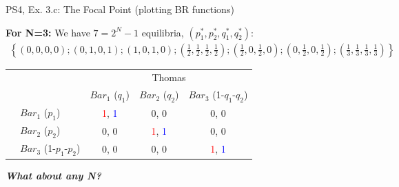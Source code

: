 \begin{frame}{PS4, Ex. 3.c: The Focal Point (plotting BR functions)}
\begin{multicols}{2}
  \vfill\null
  \end{multicols}
    \vspace{-20pt}
    \textbf{For N=3:} We have $7=2^N-1$ equilibria, $(p_1^{*},p_2^{*},q_1^{*},q_2^{*})$:
    \begin{align*}
      \left\{(0,0,0,0);(0,1,0,1);(1,0,1,0)
      ;\left(\frac{1}{2},\frac{1}{2},\frac{1}{2},\frac{1}{2}\right)
      ;\left(\frac{1}{2},0,\frac{1}{2},0\right)
      ;\left(0,\frac{1}{2},0,\frac{1}{2}\right)
      ;\left(\frac{1}{3},\frac{1}{3},\frac{1}{3},\frac{1}{3}\right)
      \right\}
    \end{align*}
    \vspace{-12pt}
    \begin{table}
      \begin{tabular}{cl|c|c|c|}
        & \multicolumn{1}{c}{} & \multicolumn{3}{c}{\color{blue}Thomas}\\
        & \multicolumn{1}{c}{} & \multicolumn{1}{c}{$Bar_1$ ($q_1$)} & \multicolumn{1}{c}{$Bar_2$ ($q_2$)} & \multicolumn{1}{c}{$Bar_3$ (1-$q_1$-$q_2$)} \\\cline{3-5}
        \parbox[t]{1mm}{}
        & $Bar_1$ ($p_1$) & \textcolor{red}{1}, \textcolor{blue}{1} & 0, 0 & 0, 0 \\
        & $Bar_2$ ($p_2$) & 0, 0 & \textcolor{red}{1}, \textcolor{blue}{1} & 0, 0 \\
        & $Bar_3$ (1-$p_1$-$p_2$) & 0, 0 & 0, 0 & \textcolor{red}{1}, \textcolor{blue}{1} \\
      \end{tabular}
    \end{table}
    \textbf{\textit{What about any N?}}
\end{frame}
